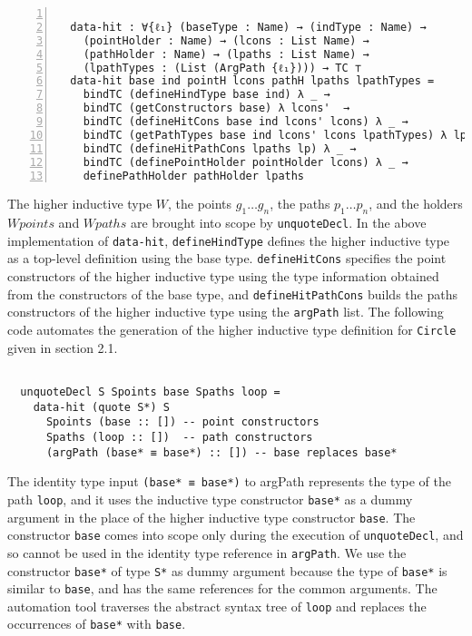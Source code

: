 \documentclass[sigplan,10pt]{acmart}
\begin{document}
\begin{center}
\begingroup
\fontsize{7pt}{9pt}\selectfont
\begin{Verbatim}[frame = lines, rulecolor=\color{blue}, numbers = left, numbersep = 0pt]

  data-hit : ∀{ℓ₁} (baseType : Name) → (indType : Name) → 
    (pointHolder : Name) → (lcons : List Name) → 
    (pathHolder : Name) → (lpaths : List Name) →
    (lpathTypes : (List (ArgPath {ℓ₁}))) → TC ⊤
  data-hit base ind pointH lcons pathH lpaths lpathTypes =
    bindTC (defineHindType base ind) λ _ → 
    bindTC (getConstructors base) λ lcons'  →
    bindTC (defineHitCons base ind lcons' lcons) λ _ →
    bindTC (getPathTypes base ind lcons' lcons lpathTypes) λ lp →
    bindTC (defineHitPathCons lpaths lp) λ _ →
    bindTC (definePointHolder pointHolder lcons) λ _ →
    definePathHolder pathHolder lpaths

\end{Verbatim}
\endgroup
\end{center}

The higher inductive type $W$, the points $g_1 \ldots g_n$, the paths $p_1 \ldots p_n$, and the holders $Wpoints$ and $Wpaths$ are brought into scope by {\tt unquoteDecl}. In the above implementation of {\tt data-hit}, {\tt defineHindType} defines the higher inductive type as a top-level definition using the base type. {\tt defineHitCons} specifies the point constructors of the higher inductive type using the type information obtained from the constructors of the base type, and {\tt defineHitPathCons} builds the paths constructors of the higher inductive type using the {\tt argPath} list. The following code automates the generation of the higher inductive type definition for {\tt Circle} given in section 2.1.
\begin{center}
\begingroup
\fontsize{8pt}{9pt}\selectfont
\begin{Verbatim}

  unquoteDecl S Spoints base Spaths loop = 
    data-hit (quote S*) S
      Spoints (base :: []) -- point constructors
      Spaths (loop :: [])  -- path constructors
      (argPath (base* ≡ base*) :: []) -- base replaces base*

\end{Verbatim}
\endgroup
\end{center}

The identity type input {\tt (base* ≡ base*)} to argPath represents the type of the path {\tt loop}, and it uses the inductive type constructor {\tt base*} as a dummy argument in the place of the higher inductive type constructor {\tt base}. The constructor {\tt base} comes into scope only during the execution of {\tt unquoteDecl}, and so cannot be used in the identity type reference in {\tt argPath}. We use the constructor {\tt base*} of type {\tt S*} as dummy argument because the type of {\tt base*} is similar to {\tt base}, and has the same references for the common arguments. The automation tool traverses the abstract syntax tree of {\tt loop} and replaces the occurrences of {\tt base*} with {\tt base}. 
\end{document}
